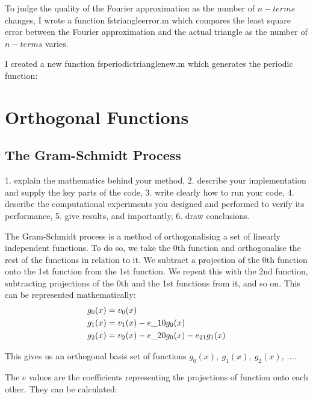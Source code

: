 \documentclass{article}
\begin{document}

To judge the quality of the Fourier approximation as the number of $ n-terms $ changes, I wrote a function fs\textunderscore triangleerror.m which compares the least square error between the Fourier approximation and the actual triangle as the number of $ n-terms $ varies. 

I created a new function fs\textunderscore periodictrianglenew.m which generates the periodic function:




\section{Orthogonal Functions}
\subsection{The Gram-Schmidt Process}
1. explain the mathematics behind your method,
2. describe your implementation and supply the key parts of the code,
3. write clearly how to run your code,
4. describe the computational experiments you designed and performed to verify its performance,
5. give results, and importantly,
6. draw conclusions.


The Gram-Schmidt process is a method of orthogonalising a set of linearly independent functions. To do so, we take the 0th function and orthogonalise the rest of the functions in relation to it. We subtract a projection of the 0th function onto the 1st function from the 1st function. We repeat this with the 2nd function, subtracting projections of the 0th and the 1st functions from it, and so on. This can be represented mathematically:
$$
\begin{aligned}
g_0(x) &= v_0(x) \\
g_1(x) &= v_1(x) -e\_{10}g_0(x) \\
g_2(x) &= v_2(x) -e\_{20}g_0(x) -e_{21}g_1(x) \\
\end{aligned} \\
$$

This gives us an orthogonal basis set of functions $ g_0(x),\ g_1(x),\ g_2(x),\ ...$.

The $e$ values are the coefficients representing the projections of function onto each other. They can be calculated:
\end{document}
